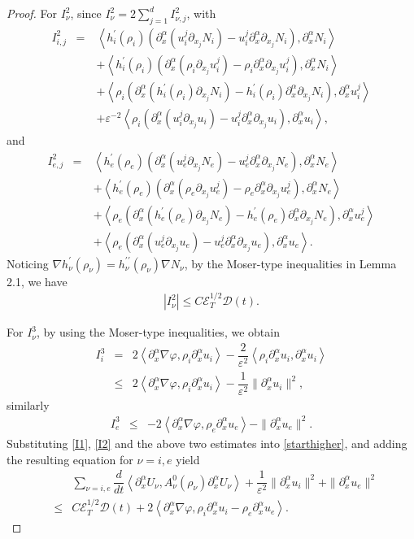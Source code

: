 \documentclass[reqno,twoside,12pt,a4paper]{amsart}
\newcommand{\eps}{\mathbb{\varepsilon}}
\newcommand{\al}{\alpha}
\newcommand{\pa}{\partial}
\newcommand{\D}{\nabla}
\newcommand{\vp}{\varphi}
\newcommand{\cubic}{C\mathscr{E}_T^{1/2}\mathscr{D}(t)}
\numberwithin{equation}{section}
\begin{document}
\begin{proof}
For $I_\nu^2$, since $I_\nu^2=2\sum_{j=1}^d I_{\nu,j}^2$, with
\begin{eqnarray*}
I_{i,j}^2&=&\left<h^\prime_i(\rho_i)\left(\pa_x^\al(u_i^j\pa_{x_j}N_i)-u_i^j\pa_x^\al\pa_{x_j}N_i\right),\pa_x^\al N_i\right>\\
  &\quad&+\left<h^\prime_i(\rho_i)\left(\pa_x^\al(\rho_i\pa_{x_j}u_i^j)-\rho_i\pa_x^\al\pa_{x_j}u_i^j\right),\pa_x^\al N_i\right>\\
  &\quad&+\left<\rho_i\left(\pa_x^\al(h_i^\prime(\rho_i)\pa_{x_j}N_i)-h_i^\prime(\rho_i)\pa_x^\al\pa_{x_j}N_i\right),\pa_x^\al u_i^j\right>\\
    &\quad&+\eps^{-2}\left<\rho_i\left(\pa_x^\al(u_i^j\pa_{x_j}u_i)-u_i^j\pa_x^\al\pa_{x_j}u_i\right),\pa_x^\al u_i\right>,
\end{eqnarray*}
and
\begin{eqnarray*}
I_{e,j}^2&=&\left<h^\prime_e(\rho_e)\left(\pa_x^\al(u_e^j\pa_{x_j}N_e)-u_e^j\pa_x^\al\pa_{x_j}N_e\right),\pa_x^\al N_e\right>\\
  &\quad&+\left<h^\prime_e(\rho_e)\left(\pa_x^\al(\rho_e\pa_{x_j}u_e^j)-\rho_e\pa_x^\al\pa_{x_j}u_e^j\right),\pa_x^\al N_e\right>\\
  &\quad&+\left<\rho_e\left(\pa_x^\al(h_e^\prime(\rho_e)\pa_{x_j}N_e)-h_e^\prime(\rho_e)\pa_x^\al\pa_{x_j}N_e\right),\pa_x^\al u_e^j\right>\\
    &\quad&+\left<\rho_e\left(\pa_x^\al(u_e^j\pa_{x_j}u_e)-u_e^j\pa_x^\al\pa_{x_j}u_e\right),\pa_x^\al u_e\right>.
\end{eqnarray*}
Noticing $\nabla h_\nu^\prime(\rho_\nu)=h_\nu^{\prime\prime}(\rho_\nu)\nabla N_\nu$, by the Moser-type inequalities in Lemma 2.1, we have
\begin{eqnarray}\label{I2}
 |I_\nu^2|\leq \cubic.
\end{eqnarray}

For $I_\nu^3$, by using the Moser-type inequalities,  we obtain
\begin{eqnarray*}
I_i^3&=&2\left<\pa_x^\al \D\vp, \rho_i\pa_x^\al u_i\right>-\dfrac{2}{\eps^2}\left<\rho_i \pa_x^\al u_i, \pa_x^\al u_i\right>\nonumber\\
&\leq&2\left<\pa_x^\al \D\vp, \rho_i\pa_x^\al u_i\right>-\dfrac{1}{\eps^2}\|\pa_x^\al u_i\|^2,
\end{eqnarray*}
similarly
\begin{eqnarray*}
I_e^3&\leq&-2\left<\pa_x^\al \D\vp, \rho_e\pa_x^\al u_e\right>-\|\pa_x^\al u_e\|^2.
\end{eqnarray*}
Substituting \eqref{I1}, \eqref{I2} and the above two estimates into \eqref{starthigher}, and adding the resulting equation for $\nu=i,e$ yield
\begin{eqnarray}\label{firstpart}
&&\sum_{\nu=i,e}\dfrac{d}{dt}\left<\pa_x^\al U_\nu, A_\nu^0(\rho_\nu) \pa_x^\al U_\nu\right> +\dfrac{1}{\eps^2}\|\pa_x^\al u_i\|^2 +\|\pa_x^\al u_e\|^2\nonumber\\
&\leq&\cubic+2\left<\pa_x^\al \D\vp, \rho_i\pa_x^\al u_i-\rho_e \pa_x^\al u_e\right>.
\end{eqnarray}


\end{proof}
\end{document}

